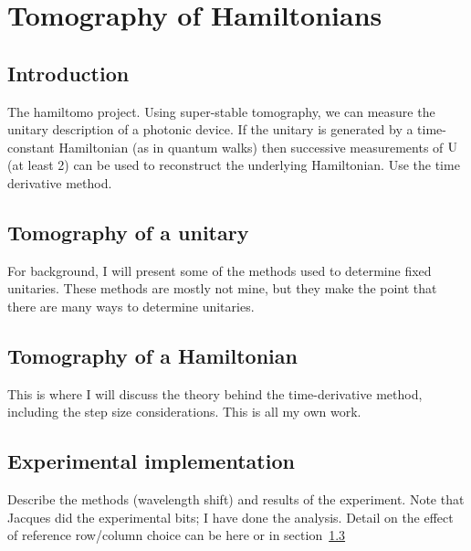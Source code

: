 \chapter{Tomography of Hamiltonians}
\label{ch:Hamiltomo}

\section{Introduction}
\label{sec:HTIntro}
The hamiltomo project. Using super-stable tomography, we can measure the unitary
description of a photonic device. If the unitary is generated by a time-constant
Hamiltonian (as in quantum walks) then successive measurements of \(\mathrm{U}\)
(at least 2) can be used to reconstruct the underlying Hamiltonian. Use the time
derivative method.

\section{Tomography of a unitary}
\label{sec:SST}
For background, I will present some of the methods used to determine fixed
unitaries. These methods are mostly not mine, but they make the point that there
are many ways to determine unitaries.

\section{Tomography of a Hamiltonian}
\label{sec:Hamiltomo}
This is where I will discuss the theory behind the time-derivative method,
including the step size considerations. This is all my own work.

\section{Experimental implementation}
\label{sec:HTExperiment}
Describe the methods (wavelength shift) and results of the experiment. Note that
Jacques did the experimental bits; I have done the analysis. Detail on the
effect of reference row/column choice can be here or in
section~\ref{sec:Hamiltomo}

